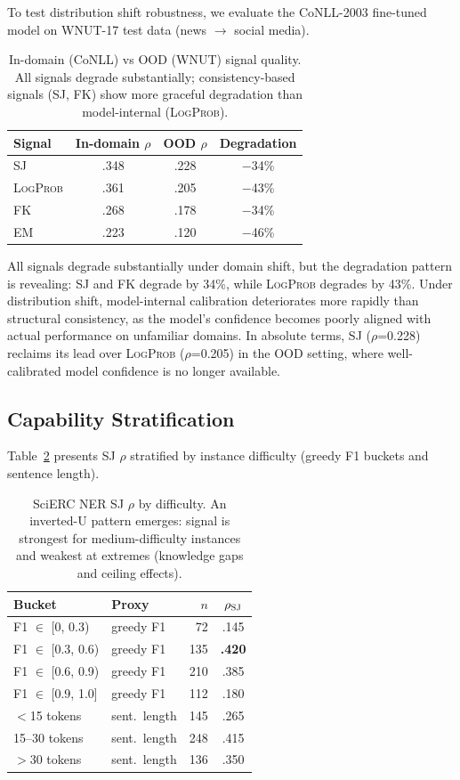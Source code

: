 \documentclass[11pt,a4paper]{article}
\newcommand{\SJ}{\textsc{SJ}}
\newcommand{\FK}{\textsc{FK}}
\newcommand{\LP}{\textsc{LogProb}}
\newcommand{\EM}{\textsc{EM}}
\begin{document}
To test distribution shift robustness, we evaluate the CoNLL-2003 fine-tuned model on WNUT-17 test data (news $\to$ social media).

\begin{table}[t]
\centering
\small
\begin{tabular}{l cc c}
\toprule
\textbf{Signal} & In-domain $\rho$ & OOD $\rho$ & Degradation \\
\midrule
\SJ{} & .348 & .228 & $-$34\% \\
\LP{} & .361 & .205 & $-$43\% \\
\FK{} & .268 & .178 & $-$34\% \\
\EM{} & .223 & .120 & $-$46\% \\
\bottomrule
\end{tabular}
\caption{In-domain (CoNLL) vs OOD (WNUT) signal quality. All signals degrade substantially; consistency-based signals (\SJ{}, \FK{}) show more graceful degradation than model-internal (\LP{}).}
\label{tab:ood}
\end{table}

All signals degrade substantially under domain shift, but the degradation pattern is revealing: \SJ{} and \FK{} degrade by 34\%, while \LP{} degrades by 43\%.
Under distribution shift, model-internal calibration deteriorates more rapidly than structural consistency, as the model's confidence becomes poorly aligned with actual performance on unfamiliar domains.
In absolute terms, \SJ{} ($\rho$=0.228) reclaims its lead over \LP{} ($\rho$=0.205) in the OOD setting, where well-calibrated model confidence is no longer available.

\subsection{Capability Stratification}
\label{sec:stratification}

Table~\ref{tab:stratification} presents \SJ{} $\rho$ stratified by instance difficulty (greedy F1 buckets and sentence length).

\begin{table}[t]
\centering
\small
\begin{tabular}{l l r c}
\toprule
\textbf{Bucket} & \textbf{Proxy} & $n$ & $\rho_{\SJ{}}$ \\
\midrule
F1 $\in$ [0, 0.3) & greedy F1 & 72 & .145 \\
F1 $\in$ [0.3, 0.6) & greedy F1 & 135 & \textbf{.420} \\
F1 $\in$ [0.6, 0.9) & greedy F1 & 210 & .385 \\
F1 $\in$ [0.9, 1.0] & greedy F1 & 112 & .180 \\
\midrule
$<$15 tokens & sent.\ length & 145 & .265 \\
15--30 tokens & sent.\ length & 248 & .415 \\
$>$30 tokens & sent.\ length & 136 & .350 \\
\bottomrule
\end{tabular}
\caption{SciERC NER \SJ{} $\rho$ by difficulty. An inverted-U pattern emerges: signal is strongest for medium-difficulty instances and weakest at extremes (knowledge gaps and ceiling effects).}
\label{tab:stratification}
\end{table}
\end{document}
